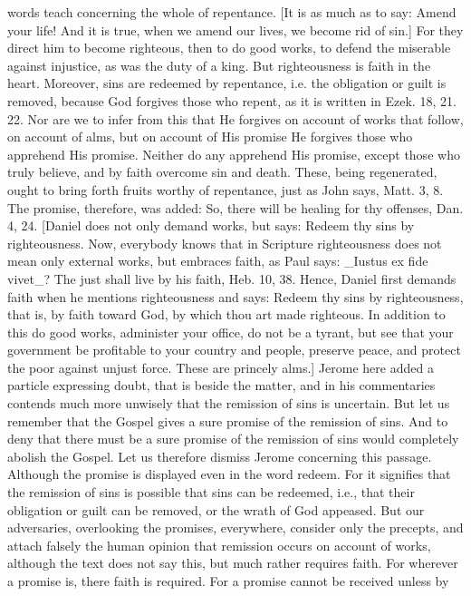 words teach concerning the whole of repentance.  [It is as much as to
say: Amend your life!  And it is true, when we amend our lives, we
become rid of sin.] For they direct him to become righteous, then to
do good works, to defend the miserable against injustice, as was the
duty of a king.  But righteousness is faith in the heart.  Moreover,
sins are redeemed by repentance, i.e. the obligation or guilt is
removed, because God forgives those who repent, as it is written in
Ezek. 18, 21. 22. Nor are we to infer from this that He forgives on
account of works that follow, on account of alms, but on account of
His promise He forgives those who apprehend His promise.  Neither do
any apprehend His promise, except those who truly believe, and by
faith overcome sin and death.  These, being regenerated, ought to
bring forth fruits worthy of repentance, just as John says, Matt. 3,
8. The promise, therefore, was added: So, there will be healing for
thy offenses, Dan. 4, 24. [Daniel does not only demand works, but
says: Redeem thy sins by righteousness.  Now, everybody knows that in
Scripture righteousness does not mean only external works, but
embraces faith, as Paul says: _Iustus ex fide vivet_?  The just shall
live by his faith, Heb. 10, 38. Hence, Daniel first demands faith
when he mentions righteousness and says: Redeem thy sins by
righteousness, that is, by faith toward God, by which thou art made
righteous.  In addition to this do good works, administer your office,
do not be a tyrant, but see that your government be profitable to
your country and people, preserve peace, and protect the poor against
unjust force.  These are princely alms.] Jerome here added a particle
expressing doubt, that is beside the matter, and in his commentaries
contends much more unwisely that the remission of sins is uncertain.
But let us remember that the Gospel gives a sure promise of the
remission of sins.  And to deny that there must be a sure promise of
the remission of sins would completely abolish the Gospel.  Let us
therefore dismiss Jerome concerning this passage.  Although the
promise is displayed even in the word redeem.  For it signifies that
the remission of sins is possible that sins can be redeemed, i.e.,
that their obligation or guilt can be removed, or the wrath of God
appeased.  But our adversaries, overlooking the promises, everywhere,
consider only the precepts, and attach falsely the human opinion that
remission occurs on account of works, although the text does not say
this, but much rather requires faith.  For wherever a promise is,
there faith is required.  For a promise cannot be received unless by
